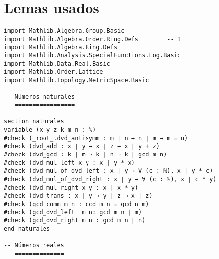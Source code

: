 

\chapter*{Lemas usados}
\begin{verbatim}
import Mathlib.Algebra.Group.Basic
import Mathlib.Algebra.Order.Ring.Defs        -- 1
import Mathlib.Algebra.Ring.Defs
import Mathlib.Analysis.SpecialFunctions.Log.Basic
import Mathlib.Data.Real.Basic
import Mathlib.Order.Lattice
import Mathlib.Topology.MetricSpace.Basic

-- Números naturales
-- =================

section naturales
variable (x y z k m n : ℕ)
#check (_root_.dvd_antisymm : m ∣ n → n ∣ m → m = n)
#check (dvd_add : x ∣ y → x ∣ z → x ∣ y + z)
#check (dvd_gcd : k ∣ m → k ∣ n → k ∣ gcd m n)
#check (dvd_mul_left x y : x ∣ y * x)
#check (dvd_mul_of_dvd_left : x ∣ y → ∀ (c : ℕ), x ∣ y * c)
#check (dvd_mul_of_dvd_right : x ∣ y → ∀ (c : ℕ), x ∣ c * y)
#check (dvd_mul_right x y : x ∣ x * y)
#check (dvd_trans : x ∣ y → y ∣ z → x ∣ z)
#check (gcd_comm m n : gcd m n = gcd n m)
#check (gcd_dvd_left  m n: gcd m n ∣ m)
#check (gcd_dvd_right m n : gcd m n ∣ n)
end naturales

-- Números reales
-- ==============


\end{verbatim}
